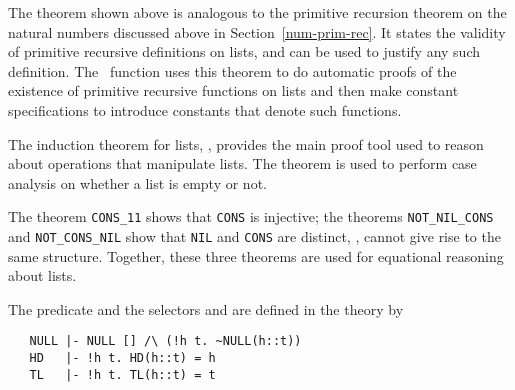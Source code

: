 The theorem  shown above is analogous to the primitive
recursion theorem
%
%
on the natural numbers discussed above in Section~\ref{num-prim-rec}.
It states the validity of primitive recursive definitions on lists,
and can be used to justify any such definition.  The \ML\ function
 uses this theorem to do
automatic
%
%
proofs of the existence of primitive recursive functions on lists and
then make constant specifications to introduce constants that denote
such functions.

The induction theorem for lists, , provides the main
proof tool used to reason about operations that manipulate lists. The
theorem  is used to perform case analysis on whether a
list is empty or not.

The theorem {\small\verb+CONS_11+} shows that {\small\verb+CONS+} is injective;
the theorems {\small\verb+NOT_NIL_CONS+} and {\small\verb+NOT_CONS_NIL+} show that
{\small\verb+NIL+} and {\small\verb+CONS+} are distinct, \ie,
cannot give rise to the same structure. Together, these three theorems
are used for equational reasoning about lists.

The predicate  and the selectors  and  are
defined
in the theory  by
%
\begin{hol}
{\small
\begin{verbatim}
   NULL |- NULL [] /\ (!h t. ~NULL(h::t))
   HD   |- !h t. HD(h::t) = h
   TL   |- !h t. TL(h::t) = t
\end{verbatim}
}
\end{hol}

